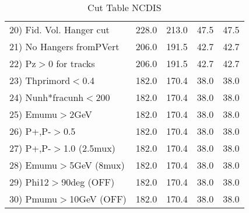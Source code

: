 \begin{table}[h!]
\begin{tabular}{||l||r|r|r|r||}
 20) Fid. Vol. Hanger cut &       228.0 &       213.0 &        47.5 &        47.5 \\
 21) No Hangers fromPVert &       206.0 &       191.5 &        42.7 &        42.7 \\
 22) Pz$>$0 for tracks    &       206.0 &       191.5 &        42.7 &        42.7 \\
 23) Thprimord$<$0.4      &       182.0 &       170.4 &        38.0 &        38.0 \\
 24) Nunh*fracunh$<$200   &       182.0 &       170.4 &        38.0 &        38.0 \\
 25) Emumu$>$2GeV         &       182.0 &       170.4 &        38.0 &        38.0 \\
 26) P+,P-$>$0.5          &       182.0 &       170.4 &        38.0 &        38.0 \\
 27) P+,P-$>$1.0 (2.5mux) &       182.0 &       170.4 &        38.0 &        38.0 \\
 28) Emumu$>$5GeV  (8mux) &       182.0 &       170.4 &        38.0 &        38.0 \\
 29) Phi12$>$90deg  (OFF) &       182.0 &       170.4 &        38.0 &        38.0 \\
 30) Pmumu$>$10GeV  (OFF) &       182.0 &       170.4 &        38.0 &        38.0 \\
 \hline
 \hline
 \end{tabular}
 \caption{Cut Table  NCDIS  }
 \label{tab-cut_ncdis}
 \end{table}
